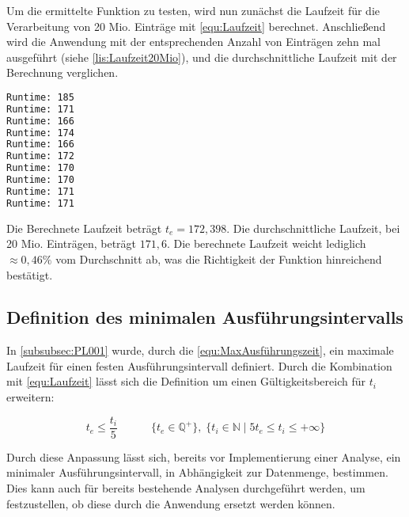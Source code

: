 Um die ermittelte Funktion zu testen, wird nun zunächst die Laufzeit für die Verarbeitung von 20 Mio. Einträge mit \autoref{equ:Laufzeit} berechnet. Anschließend wird die Anwendung mit der entsprechenden Anzahl von Einträgen zehn mal ausgeführt (siehe \autoref{lis:Laufzeit20Mio}), und die durchschnittliche Laufzeit mit der Berechnung verglichen. \\

\begin{lstlisting}[language=Bash,caption=Laufzeiten mit 20 Mio. Einträgen,label=lis:Laufzeit20Mio]
Runtime: 185
Runtime: 171
Runtime: 166
Runtime: 174
Runtime: 166
Runtime: 172
Runtime: 170
Runtime: 170
Runtime: 171
Runtime: 171
\end{lstlisting}

Die Berechnete Laufzeit beträgt $t_e = 172,398$. Die durchschnittliche Laufzeit, bei 20 Mio. Einträgen, beträgt $171,6$. Die berechnete Laufzeit weicht lediglich $\approx 0,46\%$ vom Durchschnitt ab, was die Richtigkeit der Funktion hinreichend bestätigt.

\subsection{Definition des minimalen Ausführungsintervalls}
In \autoref{subsubsec:PL001} wurde, durch die \autoref{equ:MaxAusführungszeit}, ein maximale Laufzeit für einen festen Ausführungsintervall definiert. Durch die Kombination mit \autoref{equ:Laufzeit} lässt sich die Definition um einen Gültigkeitsbereich für $t_i$ erweitern:

\begin{equation}
t_e \leq \frac{t_i}{5} \quad \quad \quad \{t_e \in \mathbb{Q}^+\},\;\{t_i \in \mathbb{N}\;|\;5t_e \leq t_i \leq +\infty\} \label{equ:MinInterval}
\end{equation}

Durch diese Anpassung lässt sich, bereits vor Implementierung einer Analyse, ein minimaler Ausführungsintervall, in Abhängigkeit zur Datenmenge, bestimmen. Dies kann auch für bereits bestehende Analysen durchgeführt werden, um festzustellen, ob diese durch die Anwendung ersetzt werden können.




